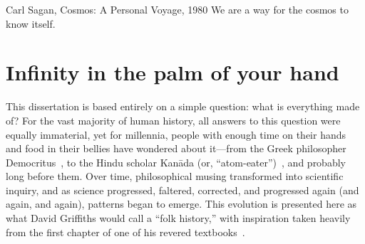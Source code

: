 \begin{dissertationintroduction}
\begin{aquote}{Carl Sagan, Cosmos: A Personal Voyage, 1980}
    We are a way for the cosmos to know itself.
\end{aquote}

\section*{Infinity in the palm of your hand}
This dissertation is based entirely on a simple question: what is everything made of? 
For the vast majority of human history, all answers to this question were equally immaterial, yet for millennia, people with enough time on their hands and food in their bellies have wondered about it---from the Greek philosopher Democritus~\cite{Taylor1419554}, to the Hindu scholar Kan\={a}da (or, ``atom-eater'')~\cite{Margenau}, and probably long before them. 
Over time, philosophical musing transformed into scientific inquiry, and as science progressed, faltered, corrected, and progressed again (and again, and again), patterns began to emerge. 
This evolution is presented here as what David Griffiths would call a ``folk history,'' with inspiration taken heavily from the first chapter of one of his revered textbooks~\cite{GriffithsParticle}.  


\end{dissertationintroduction}
